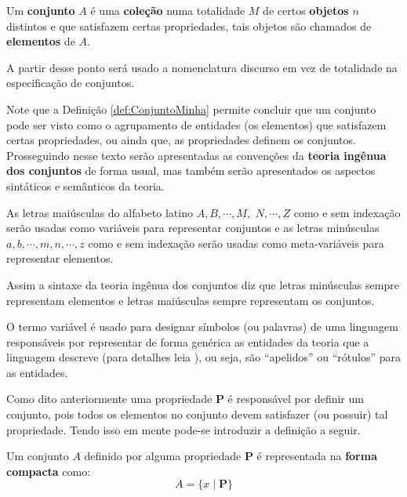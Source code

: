 \begin{definition}\label{def:ConjuntoMinha}
	Um \textbf{conjunto} $A$ é uma \textbf{coleção} numa totalidade $M$ de certos \textbf{objetos} $n$ distintos e que satisfazem certas propriedades, tais objetos são chamados de \textbf{elementos} de $A$.
\end{definition}

\begin{remark}
	A partir desse ponto será usado a nomenclatura discurso em vez de totalidade na especificação de conjuntos.
\end{remark}

Note que a Definição \ref{def:ConjuntoMinha} permite concluir que um conjunto pode ser visto como o agrupamento de entidades (os elementos) que satisfazem certas propriedades, ou ainda que, as propriedades definem os conjuntos. Prosseguindo nesse texto serão apresentadas as convenções da \textbf{teoria ingênua dos conjuntos} de forma usual, mas também serão apresentados os aspectos sintáticos e semânticos da teoria.

\begin{definition}\label{def:NotacaoConjuntos1}
	As letras maiúsculas do alfabeto latino $A, B, \cdots, M,$ $N, \cdots, Z$ como e sem indexação serão usadas como variáveis para representar conjuntos e as letras minúsculas $a, b, \cdots, m, n, \cdots, z$ como e sem indexação serão usadas como meta-variáveis para representar elementos.
\end{definition}

Assim a sintaxe da teoria ingênua dos conjuntos diz que letras minúsculas sempre representam elementos e letras maiúsculas sempre representam os conjuntos.

\begin{remark}
	O termo variável é usado para designar símbolos (ou palavras) de uma linguagem responsáveis por representar de forma genérica as entidades da teoria que a linguagem descreve (para detalhes leia \cite{sato2003}), ou seja,  são ``apelidos'' ou ``rótulos'' para as entidades.
\end{remark}

Como dito anteriormente uma propriedade $\textbf{P}$ é responsável por definir um conjunto, pois todos os elementos no conjunto devem satisfazer (ou possuir) tal propriedade. Tendo isso em mente pode-se introduzir a definição a seguir.

\begin{definition}\label{def:NotacaoCompacta}
	Um conjunto $A$ definido por alguma propriedade $\textbf{P}$ é representada na \textbf{forma compacta} como:
	\begin{equation}
		A = \{ x \mid \textbf{P}\}
	\end{equation}
\end{definition}

